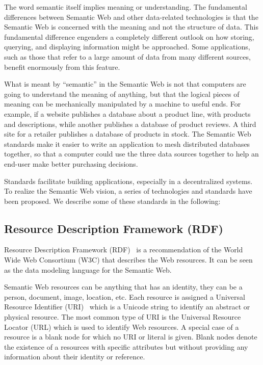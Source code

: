 The word semantic itself implies meaning or understanding. The fundamental differences between Semantic Web and other data-related technologies is that the Semantic Web is concerned with the meaning and not the structure of data. This fundamental difference engenders a completely different outlook on how storing, querying, and displaying information might be approached.  Some applications, such as those that refer to a large amount of data from many different sources, benefit enormously from this feature.

What is meant by ``semantic'' in the Semantic Web is not that computers are going to understand the meaning of anything, but that the logical pieces of meaning can be mechanically manipulated by a machine to useful ends. For example, if a website publishes a database about a product line, with products and descriptions, while another publishes a database of product reviews. A third site for a retailer publishes a database of products in stock. The Semantic Web standards make it easier to write an application to mesh distributed databases together, so that a computer could use the three data sources together to help an end-user make better purchasing decisions.

Standards facilitate building applications, especially in a decentralized systems. To realize the Semantic Web vision, a series of technologies and standards have been proposed. We describe some of these standards in the following:

\subsection{Resource Description Framework (RDF)}
Resource Description Framework (RDF)~\cite{Lassila:RDF:99} is a recommendation of the World Wide Web Consortium (W3C) that describes the Web resources. It can be seen as the data modeling language for the Semantic Web.

Semantic Web resources can be anything that has an identity, they can be a person, document, image, location, etc. Each resource is assigned a Universal Resource Identifier (URI)~\cite{Berners:RFC:05} which is a Unicode string to identify an abstract or physical resource. The most common type of URI is the Universal Resource Locator (URL) which is used to identify Web resources. A special case of a resource is a blank node for which no URI or literal is given. Blank nodes denote the existence of a resources with specific attributes but without providing any information about their identity or reference.

